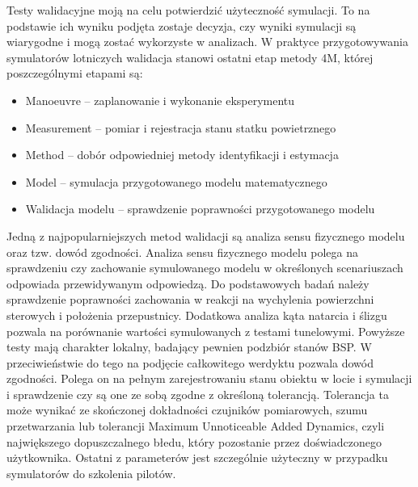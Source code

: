 \documentclass[15pt]{sprawozdanie}
\begin{document}
Testy walidacyjne moją na celu potwierdzić użyteczność symulacji. To na podstawie ich wyniku podjęta zostaje decyzja, czy wyniki symulacji są wiarygodne i mogą zostać wykorzyste w analizach. W praktyce przygotowywania symulatorów lotniczych walidacja stanowi ostatni etap metody 4M, której poszczególnymi etapami są:
\begin{itemize}[noitemsep]
\item Manoeuvre -- zaplanowanie i wykonanie eksperymentu
\item Measurement -- pomiar i rejestracja stanu statku powietrznego
\item Method -- dobór odpowiedniej metody identyfikacji i estymacja
\item Model -- symulacja przygotowanego modelu matematycznego
\item Walidacja modelu -- sprawdzenie poprawności przygotowanego modelu
\end{itemize}

Jedną z najpopularniejszych metod walidacji są analiza sensu fizycznego modelu oraz tzw. dowód zgodności. Analiza sensu fizycznego modelu polega na sprawdzeniu czy zachowanie symulowanego modelu w określonych scenariuszach odpowiada przewidywanym odpowiedzą. Do podstawowych badań należy sprawdzenie poprawności zachowania w reakcji na wychylenia powierzchni sterowych i położenia przepustnicy. Dodatkowa analiza kąta natarcia i ślizgu pozwala na porównanie wartości symulowanych z testami tunelowymi. Powyższe testy mają charakter lokalny, badający pewnien podzbiór stanów BSP. W przeciwieństwie do tego na podjęcie całkowitego werdyktu pozwala dowód zgodności. Polega on na pełnym zarejestrowaniu stanu obiektu w locie i symulacji i sprawdzenie czy są one ze sobą zgodne z określoną tolerancją. Tolerancja ta może wynikać ze skończonej dokładności czujników pomiarowych, szumu przetwarzania lub tolerancji Maximum Unnoticeable Added Dynamics, czyli największego dopuszczalnego błedu, który pozostanie przez doświadczonego użytkownika. Ostatni z parameterów jest szczególnie użyteczny w przypadku symulatorów do szkolenia pilotów.\\
\end{document}
